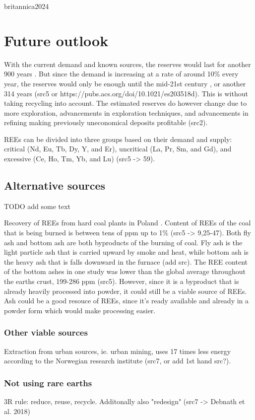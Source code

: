 britannica2024
\section{Future outlook}

With the current demand and known sources, the reserves would last for another 900 years \cite{britannica2024}. But since the demand is increasing at a rate of around 10\% every year, the reserves would only be enough until the mid-21st century \cite{britannica2024}, or another 314 years (src5 or https://pubs.acs.org/doi/10.1021/es203518d). This is without taking recycling into account. The estimated reserves do however change due to more exploration, advancements in exploration techniques, and advancements in refining making previously uneconomical deposits profitable (src2).

REEs can be divided into three groups based on their demand and supply: critical (Nd, Eu,
Tb, Dy, Y, and Er), uncritical (La, Pr, Sm, and Gd), and excessive (Ce, Ho, Tm, Yb, and Lu) (src5 -> 59).

\subsection{Alternative sources}
TODO add some text


Recovery of REEs from hard coal plants in Poland \cite{USDoE2024}. Content of REEs of the coal that is being burned is between tens of ppm up to 1\% (src5 -> 9,25-47). Both fly ash and bottom ash are both byproducts of the burning of coal. Fly ash is the light particle ash that is carried upward by smoke and heat, while bottom ash is the heavy ash that is falls downward in the furnace (add src). The REE content of the bottom ashes in one study was lower than the global average throughout the earths crust, 199-286 ppm (src5). However, since it is a byproduct that is already heavily processed into powder, it could still be a viable source of REEs. Ash could be a good resouce of REEs, since it's ready available and already in a powder form which would make processing easier.

\subsubsection{Other viable sources}

Extraction from urban sources, ie. urban mining, uses 17 times less energy according to the Norwegian research institute (src7, or add 1st hand src?).

\subsubsection{Not using rare earths}

3R rule: reduce, reuse, recycle. Additonally also "redesign" (src7 -> Debnath et al. 2018)



